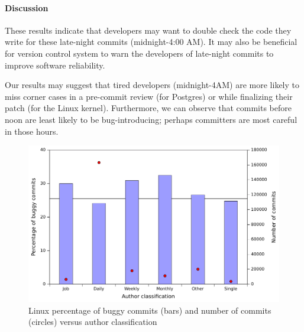 \paragraph{Discussion}
These results indicate that developers may want to double check the code they write for these 
late-night commits (midnight-4:00 AM).
It may also be beneficial for version control
system to warn the developers of late-night commits to improve software reliability. 

Our results may suggest that tired developers (midnight-4AM) are more
likely to miss corner cases in a pre-commit review (for Postgres) or
while finalizing their patch (for the Linux kernel). Furthermore, we can observe
that commits before noon are least likely to be bug-introducing;
perhaps committers are most careful in those hours.
%


\begin{figure}[thb!]
\begin{center}
\includegraphics[width=\columnwidth]{linux-bugginess-author-class.pdf}
\end{center}
\caption{\label{fig-linux-bugginess-author-class}Linux percentage of buggy commits (bars) and number of commits (circles) versus author classification}
\end{figure}


